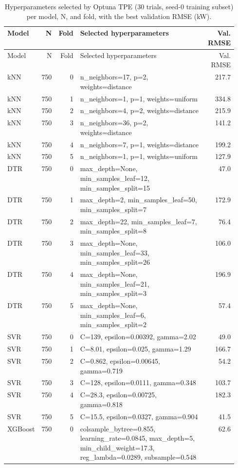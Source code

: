 \begin{longtable}{lrrp{0.55\linewidth}r}
\caption{Hyperparameters selected by Optuna TPE (30 trials, seed-0 training subset) per model, N, and fold, with the best validation RMSE (kW).}\label{tab:t7} \\
\toprule
Model & N & Fold & Selected hyperparameters & Val. RMSE \\
\midrule
\endfirsthead
\toprule
Model & N & Fold & Selected hyperparameters & Val. RMSE \\
\midrule
\endhead
\bottomrule
\endlastfoot
kNN & 750 & 0 & n\_neighbors=17, p=2, weights=distance & 217.7 \\
kNN & 750 & 1 & n\_neighbors=1, p=1, weights=uniform & 334.8 \\
kNN & 750 & 2 & n\_neighbors=4, p=2, weights=distance & 215.9 \\
kNN & 750 & 3 & n\_neighbors=36, p=2, weights=distance & 141.2 \\
kNN & 750 & 4 & n\_neighbors=7, p=1, weights=distance & 199.2 \\
kNN & 750 & 5 & n\_neighbors=1, p=1, weights=uniform & 127.9 \\
DTR & 750 & 0 & max\_depth=None, min\_samples\_leaf=12, min\_samples\_split=15 & 47.0 \\
DTR & 750 & 1 & max\_depth=2, min\_samples\_leaf=50, min\_samples\_split=7 & 172.9 \\
DTR & 750 & 2 & max\_depth=22, min\_samples\_leaf=7, min\_samples\_split=8 & 76.4 \\
DTR & 750 & 3 & max\_depth=None, min\_samples\_leaf=33, min\_samples\_split=26 & 106.0 \\
DTR & 750 & 4 & max\_depth=None, min\_samples\_leaf=21, min\_samples\_split=3 & 196.9 \\
DTR & 750 & 5 & max\_depth=None, min\_samples\_leaf=6, min\_samples\_split=2 & 57.4 \\
SVR & 750 & 0 & C=139, epsilon=0.00392, gamma=2.02 & 49.0 \\
SVR & 750 & 1 & C=8.01, epsilon=0.025, gamma=1.29 & 166.7 \\
SVR & 750 & 2 & C=0.862, epsilon=0.00645, gamma=0.719 & 54.2 \\
SVR & 750 & 3 & C=128, epsilon=0.0111, gamma=0.348 & 103.7 \\
SVR & 750 & 4 & C=28.3, epsilon=0.00725, gamma=0.818 & 182.3 \\
SVR & 750 & 5 & C=15.5, epsilon=0.0327, gamma=0.904 & 41.5 \\
XGBoost & 750 & 0 & colsample\_bytree=0.855, learning\_rate=0.0845, max\_depth=5, min\_child\_weight=17.3, reg\_lambda=0.0289, subsample=0.548 & 62.6 \\

\end{longtable}
